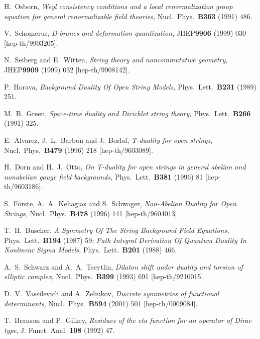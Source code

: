 \documentclass[a4paper,12pt,twoside]{article}
\begin{document}
\begin{thebibliography}{99}
H.~Osborn,
{\it Weyl consistency conditions and a local 
renormalization group equation for general renormalizable field theories,}
Nucl.\ Phys.\ {\bf B363} (1991) 486.

V.~Schomerus,
{\it D-branes and deformation quantization,}
JHEP{\bf 9906} (1999) 030
[hep-th/9903205].

N.~Seiberg and E.~Witten,
{\it String theory and noncommutative geometry,}
JHEP{\bf 9909} (1999) 032
[hep-th/9908142].


P.~Horava,
{\it Background Duality Of Open String Models,}
Phys.\ Lett.\ {\bf B231} (1989) 251.

M.~B.~Green,
{\it Space-time duality and Dirichlet string theory,}
Phys.\ Lett.\ {\bf B266} (1991) 325.

E.~Alvarez, J.~L.~Barbon and J.~Borlaf,
{\it T-duality for open strings,}
Nucl.\ Phys.\ {\bf B479} (1996) 218
[hep-th/9603089].

H.~Dorn and H.~J.~Otto,
{\it On T-duality for open strings in general 
abelian and nonabelian gauge field backgrounds,}
Phys.\ Lett.\ {\bf B381} (1996) 81
[hep-th/9603186].

S.~F\"{o}rste, A.~A.~Kehagias and S.~Schwager,
{\it Non-Abelian Duality for Open Strings,}
Nucl.\ Phys.\ {\bf B478} (1996) 141
[hep-th/9604013].

T.~H.~Buscher,
{\it A Symmetry Of The String Background Field Equations,}
Phys.\ Lett.\ {\bf B194} (1987) 59;
{\it Path Integral Derivation Of Quantum Duality In Nonlinear Sigma Models,}
Phys.\ Lett.\ {\bf B201} (1988) 466.

A.~S.~Schwarz and A.~A.~Tseytlin,
{\it Dilaton shift under duality and torsion of elliptic complex,}
Nucl.\ Phys.\ {\bf B399} (1993) 691
[hep-th/9210015].

D.~V.~Vassilevich and A.~Zelnikov,
{\it Discrete symmetries of functional determinants,}
Nucl.\ Phys.\ {\bf B594} (2001) 501
[hep-th/0009084].

T.~Branson and P.~Gilkey, {\it Residues of the eta function
for an operator of Dirac type}, J. Funct. Anal. {\bf 108} (1992)
47.

\end{thebibliography}
\end{document}

